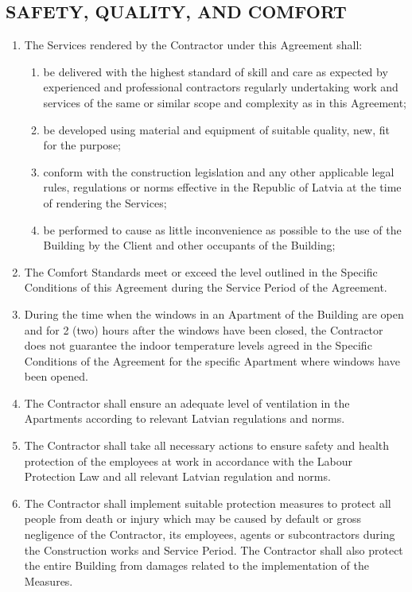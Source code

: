 \begin{multicols}{2}
\subsection{SAFETY, QUALITY, AND COMFORT}
\begin{enumerate}
	\item	The Services rendered by the Contractor under this Agreement shall:
	\begin{enumerate}
		\item	be delivered with the highest standard of skill and care as expected by experienced and professional contractors regularly undertaking work and services of the same or similar scope and complexity as in this Agreement;
		\item	be developed using material and equipment of suitable quality, new, fit for the purpose;
		\item	conform with the construction legislation and any other applicable legal rules, regulations or norms effective in the Republic of Latvia at the time of rendering the Services;
		\item	be performed to cause as little inconvenience as possible to the use of the Building by the Client and other occupants of the Building;
	\end{enumerate}
	\item	The Comfort Standards meet or exceed the level outlined in the Specific Conditions of this Agreement during the Service Period of the Agreement.
	\item	During the time when the windows in an Apartment of the Building are open and for 2 (two) hours after the windows have been closed, the Contractor does not guarantee the indoor temperature levels agreed in the Specific Conditions of the Agreement for the specific Apartment where windows have been opened.
	\item	The Contractor shall ensure an adequate level of ventilation in the Apartments according to relevant Latvian regulations and norms.
	\item	The Contractor shall take all necessary actions to ensure safety and health protection of the employees at work in accordance with the Labour Protection Law and all relevant Latvian regulation and norms.
	\item	The Contractor shall implement suitable protection measures to protect all people from death or injury which may be caused by default or gross negligence of the Contractor, its employees, agents or subcontractors during the Construction works and Service Period. The Contractor shall also protect the entire Building from damages related to the implementation of the Measures.

\end{enumerate}
\end{multicols}
